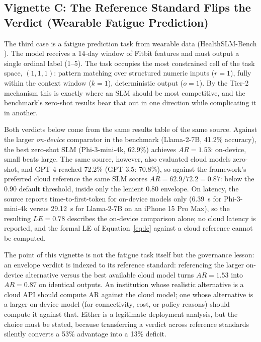 \documentclass[11pt]{article}
\begin{document}
\subsection{Vignette C: The Reference Standard Flips the Verdict (Wearable Fatigue Prediction)}
\label{sec:vignette-c}

The third case is a fatigue prediction task from wearable data (HealthSLM-Bench \cite{Wang2025}). The model receives a 14-day window of Fitbit features and must output a single ordinal label (1--5). The task occupies the most constrained cell of the task space, $(1,1,1)$: pattern matching over structured numeric inputs ($r=1$), fully within the context window ($k=1$), deterministic output ($o=1$). By the Tier-2 mechanism this is exactly where an SLM should be most competitive, and the benchmark's zero-shot results bear that out in one direction while complicating it in another.

Both verdicts below come from the same results table of the same source. Against the larger \emph{on-device} comparator in the benchmark (Llama-2-7B, 41.2\% accuracy), the best zero-shot SLM (Phi-3-mini-4k, 62.9\%) achieves $AR = 1.53$: on-device, small beats large. The same source, however, also evaluated cloud models zero-shot, and GPT-4 reached 72.2\% (GPT-3.5: 70.8\%), so against the framework's preferred cloud reference the same SLM scores $AR = 62.9/72.2 = 0.87$: below the 0.90 default threshold, inside only the lenient 0.80 envelope. On latency, the source reports time-to-first-token for on-device models only (6.39~s for Phi-3-mini-4k versus 29.12~s for Llama-2-7B on an iPhone 15 Pro Max), so the resulting $LE = 0.78$ describes the on-device comparison alone; no cloud latency is reported, and the formal LE of Equation~\ref{eq:le} against a cloud reference cannot be computed.

The point of this vignette is not the fatigue task itself but the governance lesson: an envelope verdict is indexed to its reference standard: referencing the larger on-device alternative versus the best available cloud model turns $AR = 1.53$ into $AR = 0.87$ on identical outputs. An institution whose realistic alternative is a cloud API should compute AR against the cloud model; one whose alternative is a larger on-device model (for connectivity, cost, or policy reasons) should compute it against that. Either is a legitimate deployment analysis, but the choice must be stated, because transferring a verdict across reference standards silently converts a 53\% advantage into a 13\% deficit.
\end{document}
